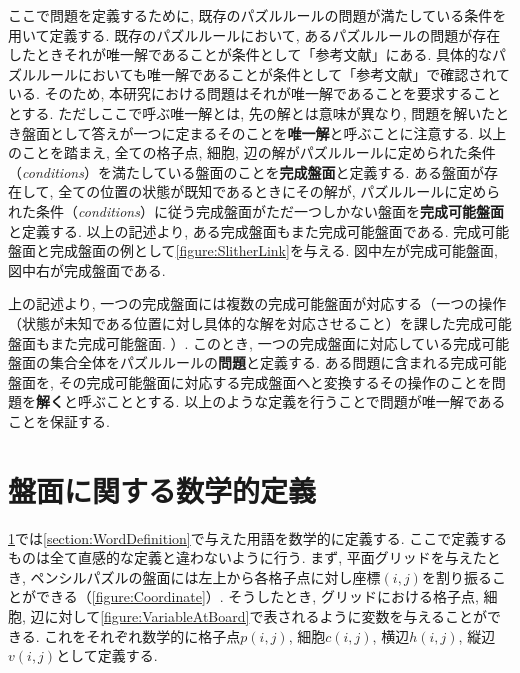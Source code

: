 ここで問題を定義するために, 既存のパズルルールの問題が満たしている条件を用いて定義する. 既存のパズルルールにおいて, あるパズルルールの問題が存在したときそれが唯一解であることが条件として「参考文献」にある. 具体的なパズルルールにおいても唯一解であることが条件として「参考文献」で確認されている. そのため, 本研究における問題はそれが唯一解であることを要求することとする. ただしここで呼ぶ唯一解とは, 先の解とは意味が異なり, 問題を解いたとき盤面として答えが一つに定まるそのことを\textbf{唯一解}と呼ぶことに注意する.
以上のことを踏まえ, 全ての格子点, 細胞, 辺の解がパズルルールに定められた条件（\textit{conditions}）を満たしている盤面のことを\textbf{完成盤面}と定義する. ある盤面が存在して, 全ての位置の状態が既知であるときにその解が, パズルルールに定められた条件（\textit{conditions}）に従う完成盤面がただ一つしかない盤面を\textbf{完成可能盤面}と定義する. 以上の記述より, ある完成盤面もまた完成可能盤面である. 完成可能盤面と完成盤面の例として\cref{figure:SlitherLink}を与える. 図中左が完成可能盤面, 図中右が完成盤面である.

上の記述より, 一つの完成盤面には複数の完成可能盤面が対応する（一つの操作（状態が未知である位置に対し具体的な解を対応させること）を課した完成可能盤面もまた完成可能盤面. ）. このとき, 一つの完成盤面に対応している完成可能盤面の集合全体をパズルルールの\textbf{問題}と定義する. ある問題に含まれる完成可能盤面を, その完成可能盤面に対応する完成盤面へと変換するその操作のことを問題を\textbf{解く}と呼ぶこととする.
以上のような定義を行うことで問題が唯一解であることを保証する.

\section{盤面に関する数学的定義}\label{section:MathematicalDefinition}
\cref{section:MathematicalDefinition}では\cref{section:WordDefinition}で与えた用語を数学的に定義する. ここで定義するものは全て直感的な定義と違わないように行う.
まず, 平面グリッドを与えたとき, ペンシルパズルの盤面には左上から各格子点に対し座標$(i,j)$を割り振ることができる（\cref{figure:Coordinate}）. そうしたとき, グリッドにおける格子点, 細胞, 辺に対して\cref{figure:VariableAtBoard}で表されるように変数を与えることができる.
これをそれぞれ数学的に格子点$p(i,j)$, 細胞$c(i,j)$, 横辺$h(i,j)$, 縦辺$v(i,j)$として定義する.

